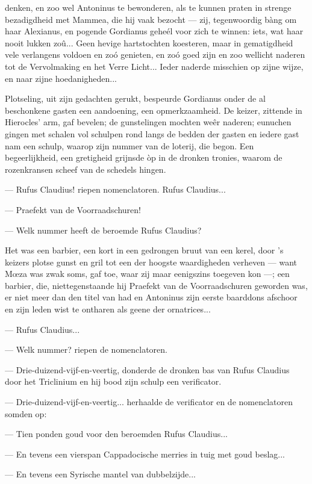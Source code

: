 \documentclass[a4paper, 12pt, oneside, dutch]{article}
\begin{document}
denken, en zoo wel Antoninus te bewonderen, als te kunnen praten in strenge bezadigdheid met Mammea, die hij vaak bezocht --- zij, tegenwoordig bàng om haar Alexianus, en pogende Gordianus geheél voor zich te winnen: iets, wat haar nooit lukken zoû... Geen hevige hartstochten koesteren, maar in gematigdheid vele verlangens voldoen en zoó genieten, en zoó goed zijn en zoo wellicht naderen tot de Vervolmaking en het Verre Licht... Ieder naderde misschien op zijne wijze, en naar zijne hoedanigheden...

Plotseling, uit zijn gedachten gerukt, bespeurde Gordianus onder de al beschonkene gasten een aandoening, een opmerkzaamheid. De keizer, zittende in Hierocles' arm, gaf bevelen; de gunstelingen mochten weêr naderen; eunuchen gingen met schalen vol schulpen rond langs de bedden der gasten en iedere gast nam een schulp, waarop zijn nummer van de loterij, die begon. Een begeerlijkheid, een gretigheid grijnsde òp in de dronken tronies, waarom de rozenkransen scheef van de schedels hingen.

--- Rufus Claudius! riepen nomenclatoren. Rufus Claudius...

--- Praefekt van de Voorraadschuren!

--- Welk nummer heeft de beroemde Rufus Claudius?

Het was een barbier, een kort in een gedrongen bruut van een kerel, door 's keizers plotse gunst en gril tot een der hoogste waardigheden verheven --- want Mœza was zwak soms, gaf toe, waar zij maar eenigszins toegeven kon ---; een barbier, die, niettegenstaande hij Praefekt van de Voorraadschuren geworden was, er niet meer dan den titel van had en Antoninus zijn eerste baarddons afschoor en zijn leden wist te ontharen als geene der ornatrices...

--- Rufus Claudius...

--- Welk nummer? riepen de nomenclatoren.

--- Drie-duizend-vijf-en-veertig, donderde de dronken bas van Rufus Claudius door het Triclinium en hij bood zijn schulp een verificator.

--- Drie-duizend-vijf-en-veertig... herhaalde de verificator en de nomenclatoren somden op:

--- Tien ponden goud voor den beroemden Rufus Claudius...

--- En tevens een vierspan Cappadocische merries in tuig met goud beslag...

--- En tevens een Syrische mantel van dubbelzijde...
\end{document}
